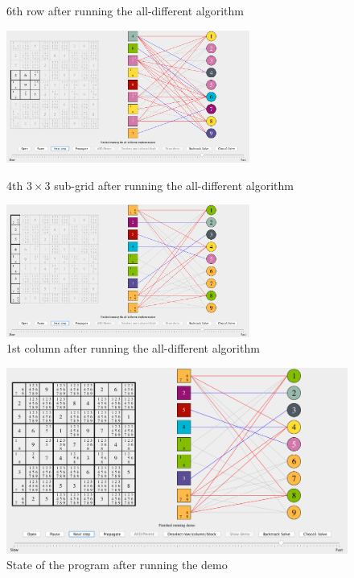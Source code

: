 \documentclass{l4proj}
\begin{document}
\begin{figure}[H]
\begin{minipage}{8.0cm}
\caption{6th row after running the all-different algorithm}
\label{screenshot4}
\end{minipage}%
\vspace*{1cm}
\begin{minipage}{8.0cm}
\centering
\includegraphics[width=8cm]{images/proof_of_concept/screenshot5.png}
\caption{4th $3\times 3$ sub-grid after running the all-different algorithm}
\label{screenshot5}
\end{minipage}%
\hfill
\begin{minipage}{8.0cm}
\centering
\includegraphics[width=8cm]{images/proof_of_concept/screenshot6.png}
\caption{1st column after running the all-different algorithm}
\label{screenshot6}
\end{minipage}%
\end{figure}

\newpage

\begin{figure}[H]
\includegraphics[width=16cm]{images/proof_of_concept/screenshot7.png}
\caption{State of the program after running the demo}
\label{screenshot7}
\end{figure}
\end{document}
